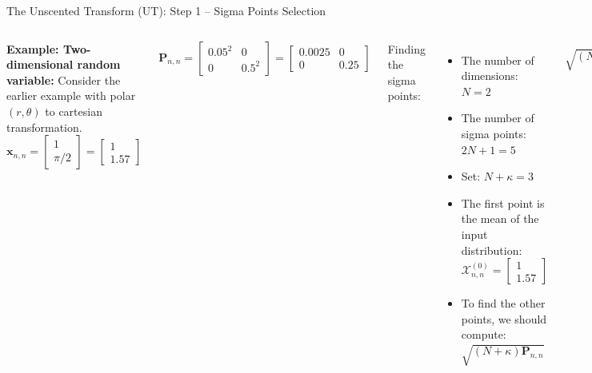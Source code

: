 \begin{frame}{The Unscented Transform (UT): Step 1 – Sigma Points Selection}
\begin{columns}
\textbf{Example: Two-dimensional random variable:} Consider the earlier example with polar \((r, \theta)\) to cartesian transformation. 
\[
\mathbf{x}_{n,n} =
\begin{bmatrix}
1 \\
\pi/2
\end{bmatrix}
=
\begin{bmatrix}
1 \\
1.57
\end{bmatrix}
\]

\[
\mathbf{P}_{n,n} =
\begin{bmatrix}
0.05^2 & 0 \\
0 & 0.5^2
\end{bmatrix}
=
\begin{bmatrix}
0.0025 & 0 \\
0 & 0.25
\end{bmatrix}
\]

Finding the sigma points:
\begin{itemize}
    \item The number of dimensions: \(N = 2\)
    \item The number of sigma points: \(2N + 1 = 5\)
    \item Set: \(N + \kappa = 3\)
    \item The first point is the mean of the input distribution: \(\mathcal{X}^{(0)}_{n,n} =
    \begin{bmatrix}
    1 \\
    1.57
    \end{bmatrix}\)
    \item To find the other points, we should compute: \(\sqrt{(N + \kappa)\mathbf{P}_{n,n}}\)
\end{itemize}
\[
\sqrt{(N + \kappa)\mathbf{P}_{n,n}} \!=\! \sqrt{3\! \begin{bmatrix}
0.0025 & 0 \\
0 & 0.25
\end{bmatrix}}
\!=\! \sqrt{\begin{bmatrix}
0.0075 & 0 \\
0 & 0.75
\end{bmatrix}}
\]
\begin{itemize}
    \item We need to find the square root of the matrix. Luckily, the covariance matrix is positive and semi-definite; therefore, we can use Cholesky decomposition to find the square root.
    $$(N+\kappa)\mathbf{P}_{n,n}$$


\end{itemize}
\end{columns}
\end{frame}
